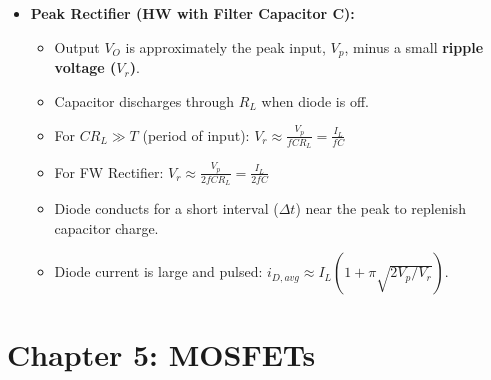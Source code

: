 \documentclass[12pt, letterpaper]{article}
\begin{document}
\begin{itemize}
    \item \textbf{Peak Rectifier (HW with Filter Capacitor C):}
    \begin{itemize}
        \item Output $V_O$ is approximately the peak input, $V_p$, minus a small \textbf{ripple voltage ($V_r$)}.
        \item Capacitor discharges through $R_L$ when diode is off.
        \item For $CR_L \gg T$ (period of input): $V_r \approx \frac{V_p}{fCR_L} = \frac{I_L}{fC}$
        \item For FW Rectifier: $V_r \approx \frac{V_p}{2fCR_L} = \frac{I_L}{2fC}$
        \item Diode conducts for a short interval ($\Delta t$) near the peak to replenish capacitor charge.
        \item Diode current is large and pulsed: $i_{D,avg} \approx I_L(1 + \pi\sqrt{2V_p/V_r})$.
    \end{itemize}
\end{itemize}

\hrulefill

\section*{Chapter 5: MOSFETs}
\end{document}

